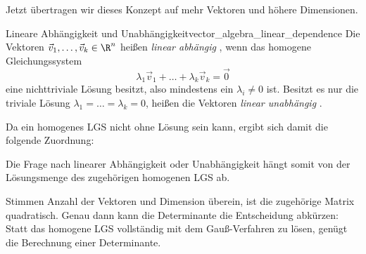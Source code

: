 Jetzt übertragen wir dieses Konzept auf mehr Vektoren und höhere Dimensionen.

\begin{DefinitionBox}{Lineare Abhängigkeit und Unabhängigkeit}{vector_algebra_linear_dependence}
  Die Vektoren $\vec v_1,\dots,\vec v_k\in\R^n$ heißen \emph{linear abhängig}
  , wenn das homogene Gleichungssystem
  \[
    \lambda_1\vec v_1+\dots+\lambda_k\vec v_k=\vec 0
  \]
  eine nichttriviale Lösung besitzt, also mindestens ein
  $\lambda_i\ne0$ ist. Besitzt es nur die triviale Lösung
  $\lambda_1=\dots=\lambda_k=0$, heißen die Vektoren \emph{linear unabhängig}
  .

  Da ein homogenes LGS nicht ohne Lösung sein kann, ergibt sich damit die
  folgende Zuordnung:
  \begin{center}
  \end{center}
\end{DefinitionBox}

\noindent
\begin{minipage}{\linewidth}
Die Frage nach linearer Abhängigkeit oder Unabhängigkeit hängt somit von
der Lösungsmenge des zugehörigen homogenen LGS ab. 

Stimmen Anzahl der Vektoren
und Dimension überein, ist die zugehörige Matrix quadratisch. Genau dann kann
die Determinante die Entscheidung abkürzen: Statt das homogene LGS vollständig
mit dem Gauß-Verfahren zu lösen, genügt die Berechnung einer Determinante.
\end{minipage}

